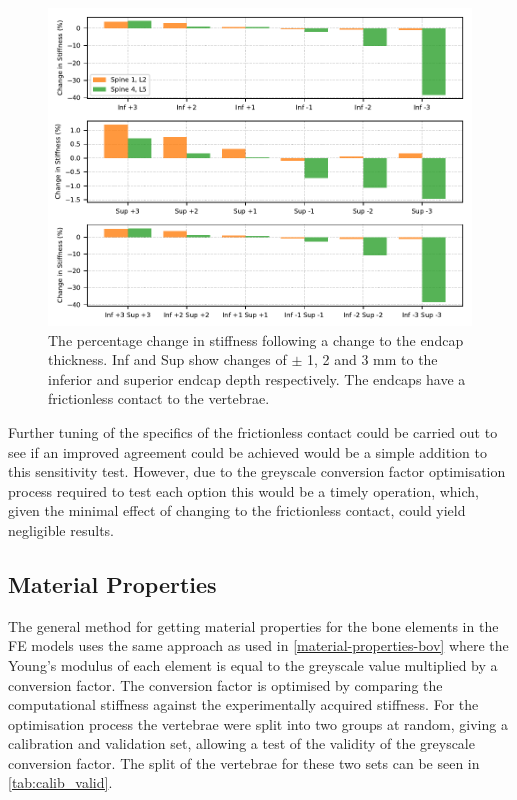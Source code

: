 \begin{figure}[h!]
\centering
\includegraphics[width=\textwidth]{Chapters/Chapter_HT_images/without.pdf}
\caption{The percentage change in stiffness following a change to the endcap thickness. Inf and Sup show changes of $\pm$ 1, 2 and 3 mm to the inferior and superior endcap depth respectively. The endcaps have a frictionless contact to the vertebrae.}
\label{fig:without}
\end{figure}

Further tuning of the specifics of the frictionless contact could be carried out to see if an improved agreement could be achieved would be a simple addition to this sensitivity test.
However, due to the greyscale conversion factor optimisation process required to test each option this would be a timely operation, which, given the minimal effect of changing to the frictionless contact, could yield negligible results.




\subsection{Material Properties}

The general method for getting material properties for the bone elements in the FE models uses the same approach as used in \cref{material-properties-bov} where the Young's modulus of each element is equal to the greyscale value multiplied by a conversion factor.
The conversion factor is optimised by comparing the computational stiffness against the experimentally acquired stiffness.
For the optimisation process the vertebrae were split into two groups at random, giving a calibration and validation set, allowing a test of the validity of the greyscale conversion factor.
The split of the vertebrae for these two sets can be seen in \cref{tab:calib_valid}.

